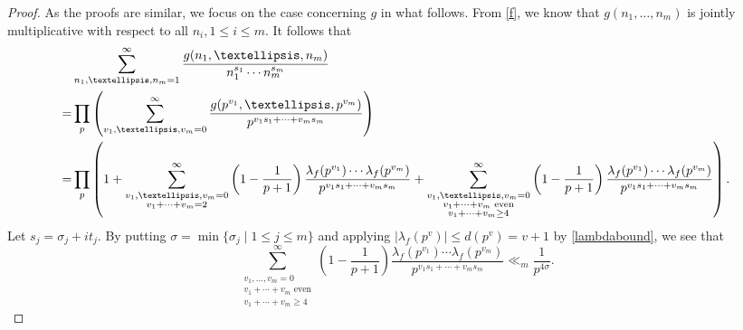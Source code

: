 \documentclass[10pt,a4paper]{amsart}
\begin{document}
\begin{proof}
  As the proofs are similar, we focus on the case concerning $g$ in what follows. From \eqref{f}, we know that $g(n_1, \ldots, n_{m})$ is jointly multiplicative with respect to all $n_i, 1\leq i \leq m$. It follows that
\begin{align*}
&\sum_{n_1,\dots,n_m=1}^{\infty}\frac{g(n_1,\dots,n_m)}{n_1^{s_1}\cdots n_m^{s_m}} \\
=& \prod_{p}\left(\sum_{v_1,\dots,v_m=0}^{\infty}\frac{g(p^{v_1},\dots,p^{v_m})}{p^{v_1s_1+\cdots+v_ms_m}}\right) \\
=& \prod_p \left( 1 + \sum^{\infty}_{\begin{subarray}{c} v_1, \ldots, v_{m}=0 \\ v_1 + \cdots + v_{m} = 2 \end{subarray}} \left( 1 - \frac{1}{p+1} \right) \frac{\lambda_f(p^{v_1})\cdots \lambda_f(p^{v_m})}{p^{v_1 s_1 + \cdots + v_{m} s_{m}}}
+ \sum^{\infty}_{\substack{v_1, \dots, v_m = 0 \\ v_1 + \cdots + v_{m} \text{ even}\\v_1+\cdots+v_m\geq 4}} \left( 1 - \frac{1}{p+1} \right) \frac{\lambda_f(p^{v_1})\cdots \lambda_f(p^{v_m})}{p^{v_1 s_1 + \cdots + v_{m} s_{m}}}\right).
\end{align*}
Let $s_j=\sigma_j+it_j$. By putting \(\sigma = \min\{ \sigma_j \mid 1 \leq j \leq m \}\) and applying $|\lambda_f(p^v)|\leq d(p^v)=v+1$ by \eqref{lambdabound}, we see that
\[
\sum^{\infty}_{\substack{v_1, \dots, v_m = 0 \\ v_1 + \cdots + v_{m} \text{ even}\\v_1+\cdots+v_m\geq 4}} \left( 1 - \frac{1}{p+1} \right) \frac{\lambda_f(p^{v_1})\cdots \lambda_f(p^{v_m})}{p^{v_1 s_1 + \cdots + v_{m} s_{m}}} \ll_m \frac{1}{p^{4\sigma}}.
\]


\end{proof}
\end{document}
